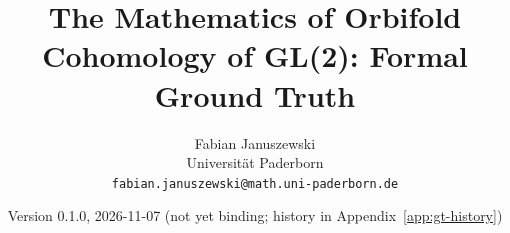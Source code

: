 \documentclass{report}
\title{The Mathematics of Orbifold Cohomology of GL(2): Formal Ground Truth}
\author{Fabian Januszewski\\ Universit\"at Paderborn\\ \texttt{fabian.januszewski@math.uni-paderborn.de}}
\date{Version 0.1.0, 2026-11-07 (not yet binding; history in Appendix~\ref{app:gt-history})}
\begin{document}
\maketitle
\begin{abstract}

\end{abstract}


\end{document}
